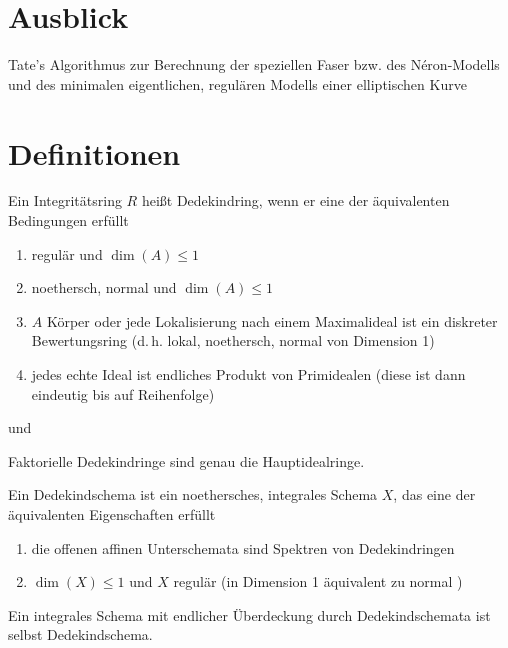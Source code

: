\documentclass[german]{scrreprt}
\begin{document}

\chapter{Ausblick}
Tate's Algorithmus zur Berechnung der speziellen Faser bzw. des
Néron-Modells und des minimalen eigentlichen, regulären Modells einer
elliptischen Kurve
\cite[IV.9]{silverman2}


\appendix
\chapter{Definitionen}

\begin{Definition}[Dedekindring]\label{def:dedekindring}
  Ein Integritätsring $R$ heißt Dedekindring, wenn er eine der
  äquivalenten Bedingungen erfüllt
  \begin{enumerate}[label=(\roman*)]
  \item regulär und $\dim(A)\leq 1$
  \item noethersch, normal und $\dim(A)\leq 1$
  \item $A$ Körper oder
    jede Lokalisierung nach einem Maximalideal ist ein diskreter
    Bewertungsring
    (d.\,h. lokal, noethersch, normal von Dimension 1)
  \item jedes echte Ideal ist endliches Produkt von Primidealen
    (diese ist dann eindeutig bis auf Reihenfolge) 
  \end{enumerate}
  \cite[S.\,40]{hartshorne} und \cite[Definition B.84]{wedhorn}

  Faktorielle Dedekindringe sind genau die Hauptidealringe.
  \cite[Proposition B.85]{wedhorn}

  \begin{Definition}[Dedekindschema]
    Ein Dedekindschema ist ein noethersches, integrales Schema $X$, das
    eine der äquivalenten Eigenschaften erfüllt
    \begin{enumerate}[label=(\roman*)]
    \item die offenen affinen Unterschemata sind Spektren von Dedekindringen
    \item $\dim(X)\leq 1$ und $X$ regulär
      (in Dimension 1 äquivalent zu normal
      \cite[Corollary 6.39, Proposition 6.40]{wedhorn})
    \end{enumerate}
    Ein integrales Schema mit endlicher Überdeckung durch Dedekindschemata
    ist selbst Dedekindschema.
    \cite[Chapter (7.13)]{wedhorn}
  \end{Definition}


\end{Definition}
\end{document}
